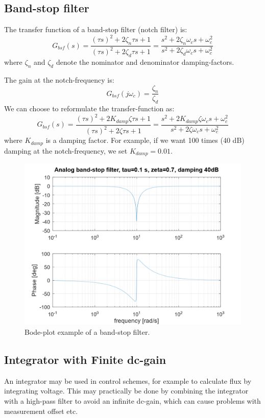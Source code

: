 \documentclass[]{book}
\begin{document}
\hypertarget{band-stop-filter}{%
\subsection{Band-stop filter}\label{band-stop-filter}}

The transfer function of a band-stop filter (notch filter) is:
\[
G_{bsf}(s) = \frac{(\tau s)^2 + 2\zeta_n \tau s + 1}{(\tau s)^2 + 2\zeta_d \tau s + 1} 
=\frac{s^2 + 2\zeta_n \omega_c s + \omega_c^2}{s^2 + 2\zeta_d \omega_c s + \omega_c^2}
\label{eq:bsf1}
\]
where \(\zeta_n\) and \(\zeta_d\) denote the nominator and denominator damping-factors.

The gain at the notch-frequency is:
\[
G_{bsf}(j\omega_c) = \frac{\zeta_n }{\zeta_d }
\label{eq:bsf2}
\]
We can choose to reformulate the transfer-function as:
\[
G_{bsf}(s) = \frac{(\tau s)^2 + 2K_{damp}\zeta \tau s + 1}{(\tau s)^2 + 2\zeta \tau s + 1} 
=\frac{s^2 + 2K_{damp}\zeta \omega_c s + \omega_c^2}{s^2 + 2\zeta \omega_c s + \omega_c^2}
\label{eq:bsf1}
\]
where \(K_{damp}\) is a damping factor. For example, if we want 100 times (40 dB) damping at the notch-frequency, we set \(K_{damp} = 0.01\).

\begin{figure}
\includegraphics[width=0.8\linewidth]{images/filters/bsf} \caption{Bode-plot example of a band-stop filter.}\label{fig:unnamed-chunk-6}
\end{figure}

\hypertarget{integrator-with-finite-dc-gain}{%
\subsection{Integrator with Finite dc-gain}\label{integrator-with-finite-dc-gain}}

An integrator may be used in control schemes, for example to calculate flux by integrating voltage. This may practically be done by combining the integrator with a high-pass filter to avoid an infinite dc-gain, which can cause problems with measurement offset etc.
\end{document}
